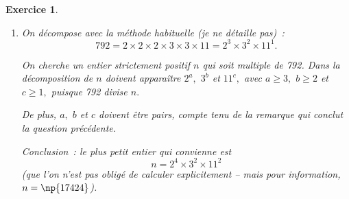 \documentclass[10pt]{article}
\newtheorem{exo}{Exercice}
\begin{document}
\begin{exo}
\begin{enumerate}
\begin{itemize}
\medskip

\textbf{Remarque~:} D'une façon générale, un entier naturel non nul est un carré parfait si, et seulement si, chaque exposant dans sa décomposition en produit de nombres premiers est un nombre pair.
\end{itemize}
\item On décompose avec la méthode habituelle (je ne détaille pas)~:
\[792=2\times  2\times 2\times 3\times 3\times 11=2^3\times 3^2\times 11^1.\]


On cherche un entier strictement positif $n$ qui soit multiple de 792. Dans la décomposition de $n$ doivent apparaître $2^a,$ $3^b$ et $11^c,$ avec $a\geq 3,$ $b\geq 2$ et $c\geq 1,$ puisque 792 divise $n.$

De plus, $a,$ $b$ et $c$ doivent être pairs, compte tenu de la remarque qui conclut la question précédente.

\medskip

Conclusion~: le plus petit entier qui convienne est
\[n=2^4\times 3^2\times 11^2\]
(que l'on n'est pas obligé de calculer explicitement -- mais pour information, $n=\np{17424}$).









\end{enumerate}
\end{exo}
\end{document}
